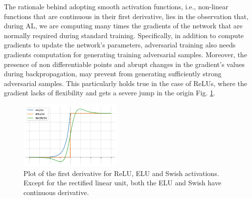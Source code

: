 \documentclass[LaM,binding=0.6cm]{./packages/sapthesis/sapthesis}
\begin{document}
    The rationale behind adopting smooth activation functions, i.e., non-linear functions that are continuous in their first derivative, lies in the 
    observation that, during AL, we are computing many times the gradients of the network that are normally required during standard training. Specifically,
    in addition to compute gradients to update the network's parameters, adversarial training also needs gradients computation for generating training 
    adversarial samples. Moreover, the presence of non differentiable points and abrupt changes in the gradient's values during backpropagation, may 
    prevent from generating sufficiently strong adversarial samples. This particularly holds true in the case of ReLUs, where the gradient lacks of flexibility 
    and gets a severe jump in the origin Fig. \ref{fig:smoothaf}. 

    \begin{figure}[h]
        \centering
        \includegraphics[width=0.45\textwidth]{smothaf.png}
        \caption{Plot of the first derivative for ReLU, ELU and Swish activations. Except for the rectified linear unit, both the ELU and Swish have continuous
        derivative.}
        \label{fig:smoothaf}
    \end{figure}
\end{document}
